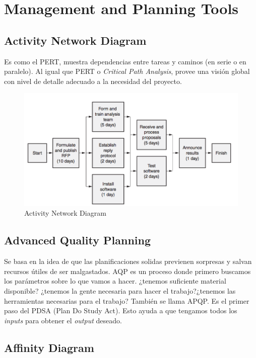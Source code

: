 \documentclass[]{article}
\begin{document}
\section{Management and Planning Tools}

\subsection{Activity Network Diagram}
Es como el PERT, muestra dependencias entre tareas y caminos (en serie o en paralelo). Al igual que PERT o \textit{Critical Path Analysis}, provee una visión global con nivel de detalle adecuado a la necesidad del proyecto.

\begin{figure}[ht!]
	\centering
	\includegraphics[width=120mm]{imagenes/AND.png}
	\caption{Activity Network Diagram}
	\label{fig:ANDDiagram}
\end{figure}

\subsection{Advanced Quality Planning} 

Se basa en la idea de que las planificaciones solidas previenen sorpresas y salvan recursos útiles de ser malgastados. AQP es un proceso donde primero buscamos los parámetros sobre lo que vamos a hacer. ¿tenemos suficiente material disponible? ¿tenemos la gente necesaria para hacer el trabajo?¿tenemos las herramientas necesarias para el trabajo? También se llama APQP. 
Es el primer paso del PDSA (Plan Do Study Act). Esto ayuda a que tengamos todos los \textit{inputs} para obtener el \textit{output} deseado. 

\subsection{Affinity Diagram}
\end{document}
